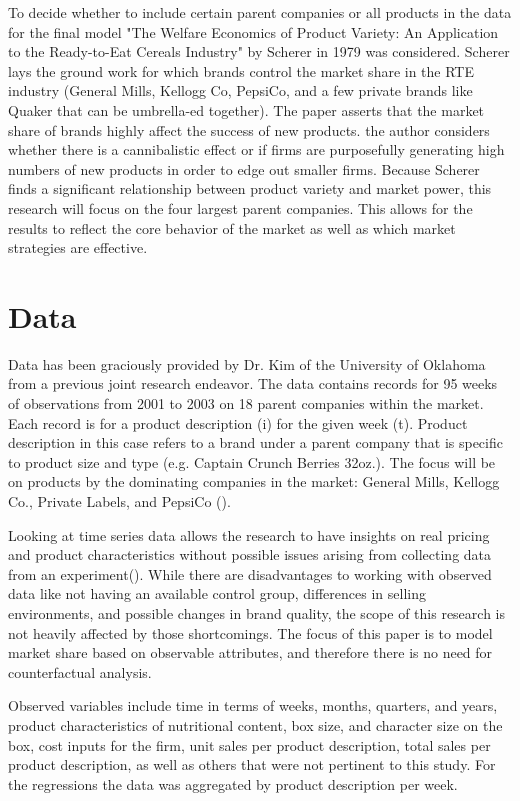 \documentclass[12pt,english]{article}
\begin{document}
\tab To decide whether to include certain parent companies or all products in the data for the final model "The Welfare Economics of Product Variety: An Application to the Ready-to-Eat Cereals Industry" by Scherer in 1979 was considered. Scherer lays the ground work for which brands control the market share in the RTE industry (General Mills, Kellogg Co, PepsiCo, and a few private brands like Quaker that can be umbrella-ed together). The paper asserts that the market share of brands highly affect the success of new products. the author considers whether there is a cannibalistic effect or if firms are purposefully generating high numbers of new products in order to edge out smaller firms. Because Scherer finds a significant relationship between product variety and market power, this research will focus on the four largest parent companies. This allows for the results to reflect the core behavior of the market as well as which market strategies are effective.


\section{Data}

\tab Data has been graciously provided by Dr. Kim of the University of Oklahoma from a previous joint research endeavor. The data contains records for 95 weeks of observations from 2001 to 2003 on 18 parent companies within the market. Each record is for a product description (i) for the given week (t). Product description in this case refers to a brand under a parent company that is specific to product size and type (e.g. Captain Crunch Berries 32oz.). 
The focus will be on products by the dominating companies in the market: General Mills, Kellogg Co., Private Labels, and PepsiCo (\cite{Scherer1979}).

\tab Looking at time series data allows the research to have insights on real pricing and product characteristics without possible issues arising from collecting data from an experiment(\citet{NeslinandShoemaker1983}). While there are disadvantages to working with observed data like not having an available control group, differences in selling environments, and possible changes in brand quality, the scope of this research is not heavily affected by those shortcomings. The focus of this paper is to model market share based on observable attributes, and therefore there is no need for counterfactual analysis.

\tab Observed variables include time in terms of weeks, months, quarters, and years, product characteristics of nutritional content, box size, and character size on the box, cost inputs for the firm, unit sales per product description, total sales per product description, as well as others that were not pertinent to this study. For the regressions the data was aggregated by product description per week. 
\end{document}
